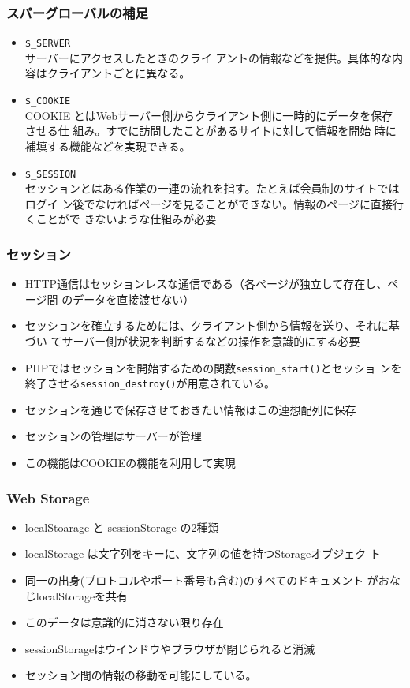  \begin{frame}[containsverbatim]
 \frametitle{スパーグローバルの補足}
 \begin{itemize}
 \item {\texttt{\$\_SERVER}}\\
 サーバーにアクセスしたときのクライ
 アントの情報などを提供。具体的な内容はクライアントごとに異なる。
 \item \texttt{\$\_COOKIE}\\
 COOKIE とはWebサーバー側からクライアント側に一時的にデータを保存させる仕
 組み。すでに訪問したことがあるサイトに対して情報を開始
 時に補填する機能などを実現できる。
 \item \texttt{\$\_SESSION}\\
 セッションとはある作業の一連の流れを指す。たとえば会員制のサイトではログイ
 ン後でなければページを見ることができない。情報のページに直接行くことがで
 きないような仕組みが必要
 \end{itemize}
 \end{frame}
 \begin{frame}[containsverbatim]
 \frametitle{セッション}
 \begin{itemize}
 \item HTTP通信はセッションレスな通信である（各ページが独立して存在し、ページ間
 のデータを直接渡せない）
 \item セッションを確立するためには、クライアント側から情報を送り、それに基づい
 てサーバー側が状況を判断するなどの操作を意識的にする必要
 \item PHPではセッションを開始するための関数\texttt{session\_start()}とセッショ
 ンを終了させる\texttt{session\_destroy()}が用意されている。
 \item セッションを通じで保存させておきたい情報はこの連想配列に保存
 \item セッションの管理はサーバーが管理
 \item この機能はCOOKIEの機能を利用して実現
 \end{itemize}
 \end{frame}
\begin{frame}[containsverbatim]
 \frametitle{Web Storage}
 \begin{itemize}
 \item localStoarage と sessionStorage の2種類
 \item localStorage は文字列をキーに、文字列の値を持つStorageオブジェク
 ト
 \item 同一の出身(プロトコルやポート番号も含む)のすべてのドキュメント
 がおなじlocalStorageを共有
 \item このデータは意識的に消さない限り存在
 \item sessionStorageはウインドウやブラウザが閉じられると消滅
 \item セッション間の情報の移動を可能にしている。
 \end{itemize}
 \end{frame}
